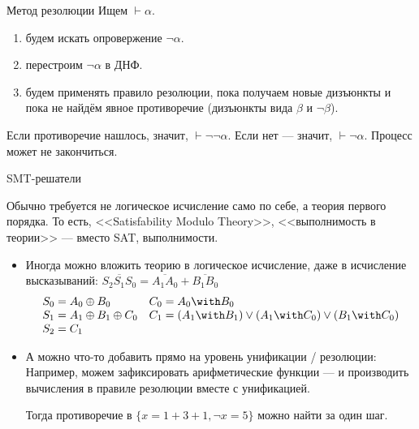 \documentclass[aspectratio=169]{beamer}
\begin{document}
\begin{frame}{Метод резолюции}
Ищем $\vdash\alpha$.

\begin{enumerate}
\item будем искать опровержение $\neg\alpha$.
\item перестроим $\neg\alpha$ в ДНФ.
\item будем применять правило резолюции, пока получаем новые дизъюнкты и пока 
не найдём явное противоречие (дизъюнкты вида $\beta$ и $\neg\beta$).
\end{enumerate}

Если противоречие нашлось, значит, $\vdash\neg\neg\alpha$. Если нет --- значит, $\vdash\neg\alpha$.
Процесс может не закончиться.
\end{frame}

\begin{frame}{SMT-решатели}

Обычно требуется не логическое исчисление само по себе, а теория первого порядка.
То есть, <<Satisfability Modulo Theory>>, <<выполнимость в теории>> --- вместо SAT, выполнимости.
\begin{itemize}
\item Иногда можно вложить теорию в логическое исчисление, 
даже в исчисление высказываний: $\overline{S_2S_1S_0} = \overline{A_1A_0}+\overline{B_1B_0}$
$$\begin{array}{ll}
S_0 = A_0 \oplus B_0 & C_0 = A_0 \with B_0\\
S_1 = A_1 \oplus B_1 \oplus C_0 & C_1 = (A_1 \with B_1) \vee (A_1 \with C_0) \vee (B_1 \with C_0) \\
S_2 = C_1\end{array}$$

\item А можно что-то добавить прямо на уровень унификации / резолюции:
Например, можем зафиксировать арифметические функции --- и производить вычисления
в правиле резолюции вместе с унификацией.

Тогда противоречие в $\{x = 1+3+1,\neg x = 5\}$ можно найти за один шаг.
\end{itemize}
\end{frame}
\end{document}
